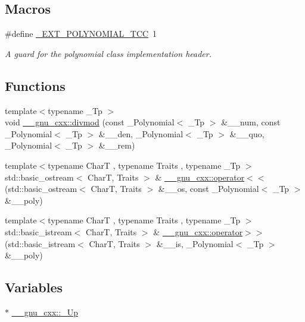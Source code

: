 \subsection*{Macros}
\begin{DoxyCompactItemize}
\item 
\#define \hyperlink{polynomial_8tcc_af5a65c717a211a48a4cf31df10b4537a}{\+\_\+\+E\+X\+T\+\_\+\+P\+O\+L\+Y\+N\+O\+M\+I\+A\+L\+\_\+\+T\+CC}~1
\begin{DoxyCompactList}\small\item\em A guard for the polynomial class implementation header. \end{DoxyCompactList}\end{DoxyCompactItemize}
\subsection*{Functions}
\begin{DoxyCompactItemize}
\item 
{\footnotesize template$<$typename \+\_\+\+Tp $>$ }\\void \hyperlink{namespace____gnu__cxx_a84c52dc7c40b8b2731425e93db52903d}{\+\_\+\+\_\+gnu\+\_\+cxx\+::divmod} (const \+\_\+\+Polynomial$<$ \+\_\+\+Tp $>$ \&\+\_\+\+\_\+num, const \+\_\+\+Polynomial$<$ \+\_\+\+Tp $>$ \&\+\_\+\+\_\+den, \+\_\+\+Polynomial$<$ \+\_\+\+Tp $>$ \&\+\_\+\+\_\+quo, \+\_\+\+Polynomial$<$ \+\_\+\+Tp $>$ \&\+\_\+\+\_\+rem)
\item 
{\footnotesize template$<$typename CharT , typename Traits , typename \+\_\+\+Tp $>$ }\\std\+::basic\+\_\+ostream$<$ CharT, Traits $>$ \& \hyperlink{namespace____gnu__cxx_ad713743dbfc30fba653621d1f7e99d3c}{\+\_\+\+\_\+gnu\+\_\+cxx\+::operator$<$$<$} (std\+::basic\+\_\+ostream$<$ CharT, Traits $>$ \&\+\_\+\+\_\+os, const \+\_\+\+Polynomial$<$ \+\_\+\+Tp $>$ \&\+\_\+\+\_\+poly)
\item 
{\footnotesize template$<$typename CharT , typename Traits , typename \+\_\+\+Tp $>$ }\\std\+::basic\+\_\+istream$<$ CharT, Traits $>$ \& \hyperlink{namespace____gnu__cxx_acf7d03318756578d08f672212cd91234}{\+\_\+\+\_\+gnu\+\_\+cxx\+::operator$>$$>$} (std\+::basic\+\_\+istream$<$ CharT, Traits $>$ \&\+\_\+\+\_\+is, \+\_\+\+Polynomial$<$ \+\_\+\+Tp $>$ \&\+\_\+\+\_\+poly)
\end{DoxyCompactItemize}
\subsection*{Variables}
\begin{DoxyCompactItemize}
\item 
$\ast$ \hyperlink{namespace____gnu__cxx_ab693ea357b6429b331e0bf09f9442385}{\+\_\+\+\_\+gnu\+\_\+cxx\+::\+\_\+\+Up}
\end{DoxyCompactItemize}


